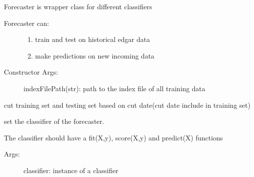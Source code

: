 \documentclass[letterpaper,10pt,english]{sphinxmanual}
\begin{document}

\begin{fulllineitems}
\label{forecaster:forecaster.Forecaster}
Forecaster is wrapper class for different classifiers
\begin{description}
\item[{Forecaster can:}] \leavevmode\begin{enumerate}
\item {} 
train and test on historical edgar data

\item {} 
make predictions on new incoming data

\end{enumerate}

\item[{Constructor Args:}] \leavevmode
indexFilePath(str): path to the index file of all training data

\end{description}

\begin{fulllineitems}
\label{forecaster:forecaster.Forecaster.GenerateTrainTestDateSet}
cut training set and testing set based on cut date(cut date include in training set)

\end{fulllineitems}


\begin{fulllineitems}
\label{forecaster:forecaster.Forecaster.setClassifier}
set the classifier of the forecaster.

The classifier should have a fit(X,y), score(X,y) and predict(X) functions
\begin{description}
\item[{Args:}] \leavevmode
classifier: instance of a classifier

\end{description}

\end{fulllineitems}


\end{fulllineitems}
\end{document}
